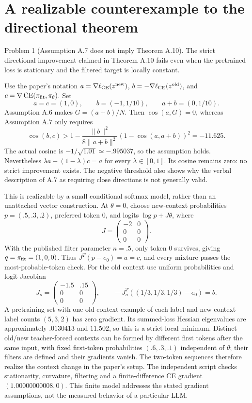 \documentclass[10pt]{article}
\begin{document}
\section*{A realizable counterexample to the directional theorem}
Problem 1 (Assumption A.7 does not imply Theorem A.10).  The strict directional improvement claimed in Theorem A.10 fails even when the pretrained loss is stationary and the filtered target is locally constant.\par
Use the paper’s notation \(a=\nabla\ell_{\rm CE}(z^{\rm new})\), \(b=-\nabla\ell_{\rm CE}(z^{\rm old})\), and \(c=\nabla\operatorname{CE}(\pi_{\rm flt},\pi_\theta)\). Set \[a=c=(1,0),\qquad b=(-1,1/10),\qquad a+b=(0,1/10).\] Assumption A.6 makes \(G=(a+b)/N\). Then \(\cos(a,G)=0\), whereas Assumption A.7 only requires \[\cos(b,c)>1-\frac{\|b\|^2}{8\|a+b\|^2}
                  (1-\cos(a,a+b))^2=-11.625.\] The actual cosine is \(-1/\sqrt{1.01}\simeq-.995037\), so the assumption holds. Nevertheless \(\lambda a+(1-\lambda)c=a\) for every \(\lambda\in[0,1]\). Its cosine remains zero: no strict improvement exists. The negative threshold also shows why the verbal description of A.7 as requiring close directions is not generally valid.\par
This is realizable by a small conditional softmax model, rather than an unattached vector construction. At \(\theta=0\), choose new-context probabilities \(p=(.5,.3,.2)\), preferred token 0, and logits \(\log p+J\theta\), where \[J=\begin{pmatrix}-2&0\\0&0\\0&0\end{pmatrix}.\] With the published filter parameter \(n=.5\), only token 0 survives, giving \(q=\pi_{\rm flt}=(1,0,0)\). Thus \(J^T(p-e_0)=a=c\), and every mixture passes the most-probable-token check. For the old context use uniform probabilities and logit Jacobian \[J_o=\begin{pmatrix}-1.5&.15\\0&0\\0&0\end{pmatrix},
 \qquad -J_o^T((1/3,1/3,1/3)-e_0)=b.\] A pretraining set with one old-context example of each label and new-context label counts \((5,3,2)\) has zero gradient. Its summed-loss Hessian eigenvalues are approximately \(.0130413\) and \(11.502\), so this is a strict local minimum. Distinct old/new teacher-forced contexts can be formed by different first tokens after the same input, with fixed first-token probabilities \((.6,.3,.1)\) independent of \(\theta\); their filters are defined and their gradients vanish. The two-token sequences therefore realize the context change in the paper’s setup. The independent script checks stationarity, curvature, filtering and a finite-difference CE gradient \((1.00000000008,0)\). This finite model addresses the stated gradient assumptions, not the measured behavior of a particular LLM.\par
\end{document}
